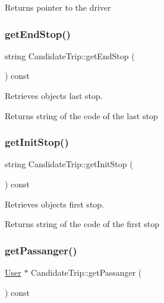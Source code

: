 \begin{DoxyReturn}{Returns}
pointer to the driver 
\end{DoxyReturn}
\mbox{\label{group___candidate_trip_ga927733e7848429732fa14994cc837f2d}} 
\subsubsection{\texorpdfstring{get\+End\+Stop()}{getEndStop()}}
{\footnotesize\ttfamily string Candidate\+Trip\+::get\+End\+Stop (\begin{DoxyParamCaption}{ }\end{DoxyParamCaption}) const}



Retrieves object\textquotesingle{}s last stop. 

\begin{DoxyReturn}{Returns}
string of the code of the last stop 
\end{DoxyReturn}
\mbox{\label{group___candidate_trip_ga1fd998715e8a0c2ee6d28ab10c3fc3bf}} 
\subsubsection{\texorpdfstring{get\+Init\+Stop()}{getInitStop()}}
{\footnotesize\ttfamily string Candidate\+Trip\+::get\+Init\+Stop (\begin{DoxyParamCaption}{ }\end{DoxyParamCaption}) const}



Retrieves object\textquotesingle{}s first stop. 

\begin{DoxyReturn}{Returns}
string of the code of the first stop 
\end{DoxyReturn}
\mbox{\label{group___candidate_trip_gad205286835f81da2cd236be0b413cbcb}} 
\subsubsection{\texorpdfstring{get\+Passanger()}{getPassanger()}}
{\footnotesize\ttfamily \hyperlink{class_user}{User} $\ast$ Candidate\+Trip\+::get\+Passanger (\begin{DoxyParamCaption}{ }\end{DoxyParamCaption}) const}



